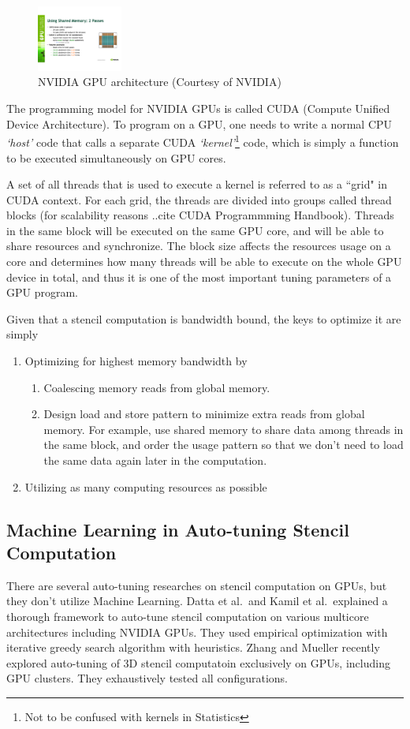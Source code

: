 \begin{figure}[!t]
\centering
\includegraphics[width=0.25\textwidth]{./images/gpu-architecture.pdf}
\caption{NVIDIA GPU architecture (Courtesy of NVIDIA)}
\label{fig:gpu-arch}
\end{figure}

The programming model for NVIDIA GPUs is called CUDA (Compute Unified Device Architecture). To program on a GPU, one needs to write a normal CPU \emph{`host'} code that calls a separate CUDA \emph{`kernel'}\footnote{Not to be confused with kernels in Statistics} code, which is simply a function to be executed simultaneously on GPU cores.

A set of all threads that is used to execute a kernel is referred to as a ``grid" in CUDA context. For each grid, the threads are divided into groups called thread blocks (for scalability reasons ..cite CUDA Programmming Handbook). Threads in the same block will be executed on the same GPU core, and will be able to share resources and synchronize. The block size affects the resources usage on a core and determines how many threads will be able to execute on the whole GPU device in total, and thus it is one of the most important tuning parameters of a GPU program.

Given that a stencil computation is bandwidth bound, the keys to optimize it are simply
\begin{enumerate}
	\item Optimizing for highest memory bandwidth by
		\begin{enumerate}
			\item Coalescing memory reads from global memory.
			\item Design load and store pattern to minimize extra reads from global memory. For example, use shared memory to share data among threads in the same block, and order the usage pattern so that we don't need to load the same data again later in the computation.
		\end{enumerate}
	\item Utilizing as many computing resources as possible
\end{enumerate}

\subsection{Machine Learning in Auto-tuning Stencil Computation}
There are several auto-tuning researches on stencil computation on GPUs, but they don't utilize Machine Learning. Datta et al.\ and Kamil et al.\ explained a thorough framework to auto-tune stencil computation on various multicore architectures including NVIDIA GPUs. They used empirical optimization with iterative greedy search algorithm with heuristics. \cite{datta08, datta09, shoaib10} Zhang and Mueller recently explored auto-tuning of 3D stencil computatoin exclusively on GPUs, including GPU clusters. They exhaustively tested all configurations. \cite{zhang12}


